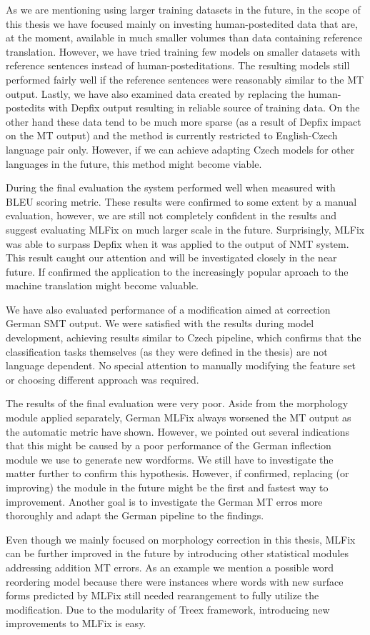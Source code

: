 As we are mentioning using larger training datasets in the future, in the scope of this thesis we have
focused mainly on investing human-postedited data that are, at the moment, available in much smaller
volumes than data containing reference translation. However, we have tried training few models on smaller
datasets with reference sentences instead of human-posteditations. The resulting models still performed
fairly well if the reference sentences were reasonably similar to the MT output. Lastly, we have
also examined data created by replacing the human-postedits with Depfix output resulting in reliable
source of training data. On the other hand these data tend to be much more sparse (as a result of Depfix
impact on the MT output) and the method is currently restricted to English-Czech language pair only.
However, if we can achieve adapting Czech models for other languages in the future, this method might
become viable.

During the final evaluation the system performed well when measured with BLEU scoring metric.
These results were confirmed to some extent by a manual evaluation, however, we are still not
completely confident in the results and suggest evaluating MLFix on much larger scale in the future.
Surprisingly, MLFix was able to surpass Depfix when it was applied to the output of NMT system.
This result caught our attention and will be investigated closely in the near future. If confirmed
the application to the increasingly popular aproach to the machine translation might become valuable.

We have also evaluated performance of a modification aimed at correction German SMT output. We were
satisfied with the results during model development, achieving results similar to Czech pipeline,
which confirms that the classification tasks themselves (as they were defined in the thesis) are
not language dependent. No special attention to manually modifying the feature set or choosing
different approach was required.

The results of the final evaluation were very poor. Aside from the morphology module applied separately,
German MLFix always worsened the MT output as the automatic metric have shown. However, we pointed out
several indications that this might be caused by a poor performance of the German inflection module
we use to generate new wordforms. We still have to investigate the matter further to confirm this hypothesis.
However, if confirmed, replacing (or improving) the module in the future might be the first and fastest
way to improvement.
Another goal is to investigate the German MT erros more thoroughly and adapt the German pipeline to the findings.

Even though we mainly focused on morphology correction in this thesis, MLFix can be further improved
in the future by introducing other statistical modules addressing addition MT errors. As an example
we mention a possible word reordering model because there were instances where words with new surface
forms predicted by MLFix still needed rearangement to fully utilize the modification. Due to the modularity
of Treex framework, introducing new improvements to MLFix is easy.
